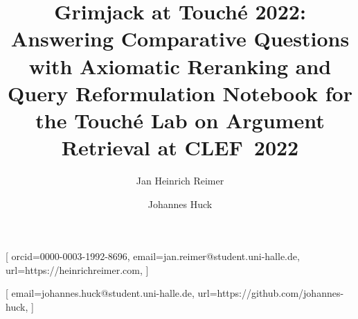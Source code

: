 \documentclass{ceurart}
\begin{document}

\title{%
  Grimjack at Touché 2022:\\
  Answering Comparative Questions with Axiomatic Reranking and Query Reformulation%
}
\title[mode=sub]{%
  Notebook for the Touché Lab on Argument Retrieval at CLEF~2022%
}

\author[1]{Jan Heinrich Reimer}[
  orcid=0000-0003-1992-8696,
  email=jan.reimer@student.uni-halle.de,
  url=https://heinrichreimer.com,
]
\author[1]{Johannes Huck}[
  email=johannes.huck@student.uni-halle.de,
  url=https://github.com/johannes-huck,
]

\address[1]{%
  Martin-Luther-Universität Halle-Wittenberg,
  06099~Halle~(Saale), Germany
}



\maketitle








\end{document}
